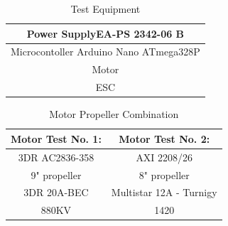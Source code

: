 \begin {table}[H]
    \begin{center}
    \caption {Test Equipment} 
    \label{tab:tab8} 
    \begin{tabular}{|c|}\hline 
        Power SupplyEA-PS 2342-06 B           \\ \hline
        Microcontoller Arduino Nano ATmega328P \\ \hline
        Motor \\ \hline
        ESC\\ \hline    
        \end{tabular}
    \end{center}
\end{table}

\begin {table}[H]
    \begin{center}
    \caption {Motor Propeller Combination} 
    \label{tab:tab9} 
    \begin{tabular}{|c|c|}\hline 
        Motor Test No. 1: & Motor Test No. 2:  \\ \hline
        3DR AC2836-358  & AXI 2208/26 \\ \hline
        9" propeller & 8" propeller \\ \hline
        3DR 20A-BEC & Multistar 12A - Turnigy \\ \hline
        880KV & 1420 \\ \hline
        \end{tabular}
    \end{center}
\end{table}


